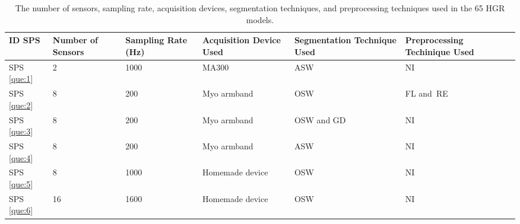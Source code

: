 \documentclass[sensors,review,accept,moreauthors,pdftex]{Definitions/mdpi}
\begin{document}
\begin{table}[H]
\centering
\caption{The number of sensors, sampling rate, acquisition devices, segmentation techniques, and preprocessing techniques used in the 65 HGR models.} \label{tab:8}
\begin{tabular}{m{30pt}m{44pt}m{40pt}m{113pt}m{67pt}m{70pt}}
\toprule
\textbf{ID SPS}&\textbf{Number of Sensors}&\textbf{Sampling Rate (Hz)}&\textbf{Acquisition Device Used}&\textbf{Segmentation Technique Used}&\textbf{Preprocessing Techinique Used}\\
	\midrule
%	
%	
%	
%	




		SPS \ref{que:1}	&	2	&	1000	&	 MA300 &ASW&NI\\
								
		SPS \ref{que:2}	&	8	&	200	&	Myo armband&OSW&FL and~RE\\
								
		SPS \ref{que:3}	&	8	&	200	&	Myo armband& OSW and GD&NI \\
								
		SPS \ref{que:4}	&	8	&	200	&	Myo armband&ASW&NI\\
%
		
								
		SPS \ref{que:5}	&	8	&	1000	&	Homemade device& OSW&NI\\
								
		SPS \ref{que:6}	&	16	&	1600	&	Homemade device& OSW&NI\\
								

\end{tabular}
\end{table}
\end{document}
